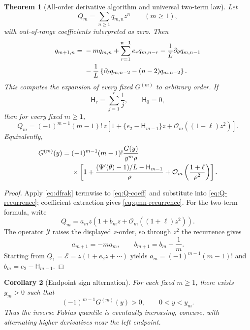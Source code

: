 \documentclass[11pt,oneside]{article}
\numberwithin{equation}{section}
\newtheorem{theorem}{Theorem}[section]
\newtheorem{corollary}[theorem]{Corollary}
\theoremstyle{definition}
\theoremstyle{remark}
\newcommand{\cO}{\mathcal O}
\begin{document}
\begin{theorem}[All-order derivative algorithm and universal two-term law]
\label{thm:derivative-hierarchy}
Let
\begin{equation}
 Q_m=\sum_{n\ge1}q_{m,n}z^n\qquad(m\ge1),
 \label{eq:Q-coeff}
\end{equation}
with out-of-range coefficients interpreted as zero.  Then
\begin{align}
 q_{m+1,n}={}&-m q_{m,n}
 +\sum_{r=1}^{n-1}e_rq_{m,n-r}
 -\frac1L\partial_\theta q_{m,n-1}
 \notag\\
 &-\frac1L\left\{
 \partial_\ell q_{m,n-2}-(n-2)q_{m,n-2}
 \right\}.
 \label{eq:qmn-recurrence}
\end{align}
This computes the expansion of every fixed $G^{(m)}$ to arbitrary order.  If
\begin{equation}
 \mathsf H_r=\sum_{j=1}^{r}\frac1j,
 \qquad \mathsf H_0=0,
 \label{eq:harmonic-number}
\end{equation}
then for every fixed $m\ge1$,
\begin{equation}
 \boxed{
 Q_m=(-1)^{m-1}(m-1)!\,z
 \left[1+\{e_2-\mathsf H_{m-1}\}z
 +\cO_m((1+\ell)z^2)\right].}
 \label{eq:Q-two-term}
\end{equation}
Equivalently,
\begin{align}
 G^{(m)}(y)={}&(-1)^{m-1}(m-1)!\frac{G(y)}{y^m\rho}
 \notag\\
 &\times\left[1+
 \frac{(\Psi'(\theta)-1)/L-\mathsf H_{m-1}}{\rho}
 +\cO_m\left(\frac{1+\ell}{\rho^2}\right)\right].
 \label{eq:Gm-two-term}
\end{align}
\end{theorem}

\begin{proof}
Apply \cref{eq:dfrak} termwise to \cref{eq:Q-coeff} and substitute into
\cref{eq:Q-recurrence}; coefficient extraction gives
\cref{eq:qmn-recurrence}.  For the two-term formula, write
\begin{equation}
 Q_m=a_mz(1+b_mz+\cO_m((1+\ell)z^2)).
\end{equation}
The operator $\mathcal Y$ raises the displayed $z$-order, so through $z^2$ the recurrence gives
\begin{equation}
 a_{m+1}=-ma_m,
 \qquad
 b_{m+1}=b_m-\frac1m.
\end{equation}
Starting from $Q_1=\mathcal E=z(1+e_2z+\cdots)$ yields
$a_m=(-1)^{m-1}(m-1)!$ and
$b_m=e_2-\mathsf H_{m-1}$.
\end{proof}

\begin{corollary}[Endpoint sign alternation]
For each fixed $m\ge1$, there exists $y_m>0$ such that
\begin{equation}
 (-1)^{m-1}G^{(m)}(y)>0,
 \qquad 0<y<y_m.
 \label{eq:sign-alternation}
\end{equation}
Thus the inverse Fabius quantile is eventually increasing, concave, with alternating higher derivatives near the left endpoint.
\end{corollary}
\end{document}
